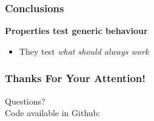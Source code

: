 \documentclass[xcolor=dvipsnames]{beamer}
\begin{document}
\begin{frame}
  \frametitle{Conclusions}

  \textbf{Properties test generic behaviour}
  \begin{itemize}
  \item They test \textit{what should always work}
  \end{itemize}
\end{frame}


\begin{frame}
  \frametitle{Thanks For Your Attention!}
  \begin{center}
    \huge{Questions?}\\
    \vspace{1cm}
    \normalsize
    Code available in Github: \color{blue}{http://github.com/lambdastream/tdd\_template}
  \end{center}
\end{frame}

\begin{frame}
  \titlepage
\end{frame}
\end{document}
